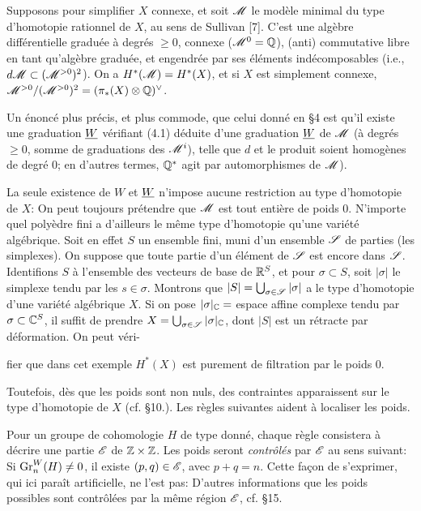 \documentclass[8pt]{extarticle}
\begin{document}
 Supposons pour simplifier \(X\) connexe, et soit \(\mathscr{M}\) le modèle minimal du type d'homotopie rationnel de \(X\), au sens de Sullivan [7]. C'est une algèbre différentielle graduée à degrés \(\ge0\), connexe (\(\mathscr{M}^0=\mathbb{Q}\)), (anti) commutative libre en tant qu'algèbre graduée, et engendrée par ses éléments indécomposables (i.e., \(d\mathscr{M}\subset(\mathscr{M}^{>0})^2\)). On a \(H^*(\mathscr{M})=H^*(X)\), et si \(X\) est simplement connexe, \(\mathscr{M}^{>0}/(\mathscr{M}^{>0})^2=(\pi_*(X)\otimes\mathbb{Q})^\vee\).

Un énoncé plus précis, et plus commode, que celui donné en §4 est qu'il existe une graduation \(\underline{W}\) vérifiant (4.1) déduite d'une graduation \(\underline{W}\) de \(\mathscr{M}\) (à degrés \(\ge0\), somme de graduations des \(\mathscr{M}^i\)), telle que \(d\) et le produit soient homogènes de degré 0; en d'autres termes, \(\mathbb{Q}^*\) agit par automorphismes de \(\mathscr{M}\)).

 La seule existence de \(W\) et \(\underline{W}\) n'impose aucune restriction au type d'homotopie de \(X\): On peut toujours prétendre que \(\mathscr{M}\) est tout entière de poids 0. N'importe quel polyèdre fini a d'ailleurs le même type d'homotopie qu'une variété algébrique. Soit en effet \(S\) un ensemble fini, muni d'un ensemble \(\mathscr{S}\) de parties (les simplexes). On suppose que toute partie d'un élément de \(\mathscr{S}\) est encore dans \(\mathscr{S}\). Identifions \(S\) à l'ensemble des vecteurs de base de \(\mathbb{R}^S\), et pour \(\sigma\subset S\), soit \(|\sigma|\) le simplexe tendu par les \(s\in\sigma\). Montrons que \(|S|=\bigcup_{\sigma\in\mathscr{S}}|\sigma|\) a le type d'homotopie d'une variété algébrique \(X\). Si on pose \(|\sigma|_{\mathbb{C}}=\) espace affine complexe tendu par \(\sigma\subset\mathbb{C}^S\), il suffit de prendre \(X=\bigcup_{\sigma\in\mathscr{S}}|\sigma|_{\mathbb{C}}\), dont \(|S|\) est un rétracte par déformation. On peut véri-
\EndSourcePage

\ReaderFont
fier que dans cet exemple \(H^*(X)\) est purement de filtration par le poids 0.

Toutefois, dès que les poids sont non nuls, des contraintes apparaissent sur le type d'homotopie de \(X\) (cf. §10.). Les règles suivantes aident à localiser les poids.

 Pour un groupe de cohomologie \(H\) de type donné, chaque règle consistera à décrire une partie \(\mathscr{E}\) de \(\mathbb{Z}\times\mathbb{Z}\). Les poids seront \emph{contrôlés} par \(\mathscr{E}\) au sens suivant: Si \(\operatorname{Gr}_n^W(H)\ne0\), il existe \((p,q)\in\mathscr{E}\), avec \(p+q=n\). Cette façon de s'exprimer, qui ici paraît artificielle, ne l'est pas: D'autres informations que les poids possibles sont contrôlées par la même région \(\mathscr{E}\), cf. §15.
\end{document}
